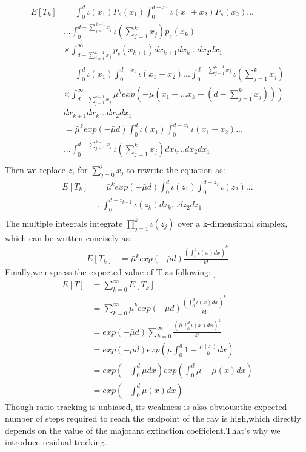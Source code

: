 \documentclass[acmtog]{acmart}
\begin{document}
\begin{equation}
	\begin{aligned}
		E[T_k] &= \int_{0}^{d}\iota(x_1) P_s(x_1)\int_{0}^{d-x_1}\iota(x_1+x_2) P_s(x_2)...\\&...
		\int_{0}^{d-\sum_{j=1}^{k-1}x_j}\iota (\sum_{j=1}^{k}x_j)p_s(x_k)\\
		&\times\int_{d-\sum_{j=1}^{k-1}x_j}^{\infty}p_s(x_{k+1})dx_{k+1}dx_k...dx_2dx_1\\
		&=\int_{0}^{d}\iota(x_1)\int_{0}^{d-x_1}\iota(x_1+x_2)...\int_{0}^{d-\sum_{j=1}^{k-1}x_j}\iota (\sum_{j=1}^{k}x_j) \\
		&\times\int_{d-\sum_{j=1}^{k-1}x_j}^{\infty}\bar{\mu}^kexp(-\bar{\mu}(x_1+...x_k+(d-\sum_{j=1}^{k}x_j)))\\&dx_{k+1}dx_k...dx_2dx_1\\
		&=\bar{\mu}^kexp(-\bar{\mu}d)\int_{0}^{d}\iota(x_1)\int_{0}^{d-x_1}\iota(x_1+x_2)...\\
		&...\int_{0}^{d-\sum_{j=1}^{k-1}x_j}\iota (\sum_{j=1}^{k}x_j)dx_k...dx_2dx_1\\
	\end{aligned}
\end{equation}
Then we replace $z_i$ for $\sum_{j=0}^{i}x_j$ to rewrite the equation as:
\begin{equation}
	\begin{aligned}
		E[T_k]&=\bar{\mu}^kexp(-\bar{\mu}d)\int_{0}^{d}\iota(z_1)\int_{0}^{d-z_1}\iota(z_2)...\\
		&...\int_{0}^{d-z_{k-1}}\iota (z_k)dz_k...dz_2dz_1\\
	\end{aligned}
\end{equation}
The multiple integrals integrate $\prod_{j=1}^{k}\iota(z_j) $ over a k-dimensional simplex, which can be written concisely as:
\begin{equation}
	\begin{aligned}
		E[T_k]&=\bar{\mu}^kexp(-\bar{\mu}d)\frac{(\int_{0}^{d}\iota(x)dx)^k}{k!}
	\end{aligned}
\end{equation}
Finally,we express the expected value of T as following:
]\begin{equation}
	\begin{aligned}
		E[T]&=\sum_{k=0}^{\infty}E[T_k]\\
		&=\sum_{k=0}^{\infty}\bar{\mu}^kexp(-\bar{\mu}d)\frac{(\int_{0}^{d}\iota(x)dx)^k}{k!}\\
		&=exp(-\bar{\mu}d)\sum_{k=0}^{\infty}\frac{(\bar{\mu}\int_{0}^{d}\iota(x)dx)^k}{k!}\\
		&=exp(-\bar{\mu}d)exp(\bar{\mu}\int_{0}^{d}1-\frac{\mu(x)}{\bar{\mu}}dx)\\
		&=exp(-\int_{0}^{d}\bar{\mu}dx)exp(\int_{0}^{d}\bar{\mu}-\mu(x)dx)\\
		&=exp(-\int_{0}^{d}{\mu}(x)dx)
	\end{aligned}
\end{equation}
Though ratio tracking is unbiased, its weakness is also obvious:the expected number of steps required to reach the endpoint of the ray is high,which directly depends on the value of the majorant extinction coefficient.That's why we introduce residual tracking.
\end{document}
